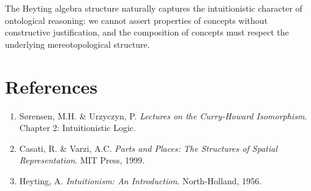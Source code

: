 \documentclass{itt-lean}
\begin{document}
The Heyting algebra structure naturally captures the intuitionistic character of ontological reasoning: we cannot assert properties of concepts without constructive justification, and the composition of concepts must respect the underlying mereotopological structure.

\section*{References}

\begin{enumerate}
	\item Sørensen, M.H. \& Urzyczyn, P. \textit{Lectures on the Curry-Howard Isomorphism}. Chapter 2: Intuitionistic Logic.
	\item Casati, R. \& Varzi, A.C. \textit{Parts and Places: The Structures of Spatial Representation}. MIT Press, 1999.
	\item Heyting, A. \textit{Intuitionism: An Introduction}. North-Holland, 1956.
\end{enumerate}
\end{document}
